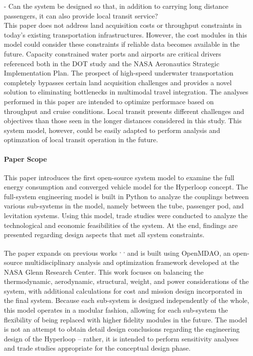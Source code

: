 	- Can the system be designed so that, in addition to carrying long distance
	passengers, it can also provide local transit service?\\

	This paper does not address land acquisition costs or throughput
	constraints in today's existing transportation infrastructures. However, the cost
	modules in this model could consider these constraints if reliable data becomes available in the future.
	Capacity constrained water ports and airports are critical drivers referenced
	both in the DOT study and the NASA Aeronautics Strategic
	Implementation Plan. The prospect of high-speed underwater transportation
	completely bypasses certain land acquisition challenges and provides a novel solution
	to eliminating bottlenecks in multimodal travel integration. The analyses performed in this paper
	are intended to optimize performace based on throughput and cruise conditions.
	Local transit presents different challenges and objectives than those seen in the longer distances
	considered in this study. This system model, however, could be easily adapted to perform
	analysis and optimzation of local transit operation in the future.\\

\paragraph{Paper Scope}
	This paper introduces the first open-source system model to examine the
	full energy consumption and converged vehicle model for the Hyperloop concept.
	The full-system engineering model is built in Python to analyze the couplings
	between various sub-systems in the model, namely between the tube, passenger pod, and
	levitation systems. Using this model, trade studies were conducted to analyze the technological
	and economic feasibilities of the system.
	At the end, findings are presented regarding design aspects that
	met all system constraints.

	The paper expands on previous works \cite{Chin} \textsuperscript{,}
	\cite{goodwin2009cantera}\textsuperscript{,} \cite{GrayBenchmarking2013}
	and is built using OpenMDAO, an open-source multidisciplinary analysis and optimization framework
	developed at the NASA Glenn Research Center.
	This work focuses on balancing the thermodynamic, aerodynamic, structural,
	weight, and power considerations of the system, with additional calculations for cost
	and mission design incorporated in the final system. Because each sub-system
	is designed independently of the whole, this model operates in a modular fashion, allowing
	for each sub-system the flexibility of being replaced with higher fidelity modules in the future.
	The model is not an attempt to obtain detail design conclusions regarding the
	engineering design of the Hyperloop -- rather, it is intended to perform sensitivity analyses and
	trade studies appropriate for the conceptual design phase.

